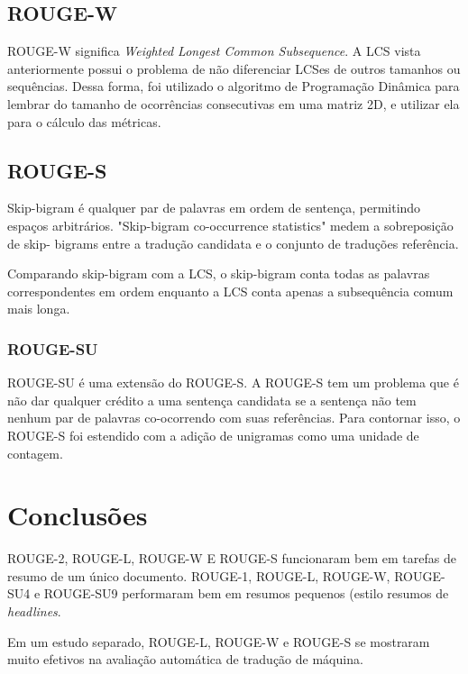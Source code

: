 \documentclass[12pt]{article}
\begin{document}
\subsection*{ROUGE-W}

ROUGE-W significa \textit{Weighted Longest Common Subsequence}. A LCS vista anteriormente possui o problema de não diferenciar LCSes de outros tamanhos ou sequências. Dessa forma, foi utilizado o algoritmo de Programação Dinâmica para lembrar do tamanho de ocorrências consecutivas em uma matriz 2D, e utilizar ela para o cálculo das métricas.

\subsection*{ROUGE-S}

Skip-bigram é qualquer par de palavras em ordem de sentença, permitindo espaços arbitrários. "Skip-bigram co-occurrence statistics" medem a sobreposição de skip-
bigrams entre a tradução candidata e o conjunto de traduções referência.

Comparando skip-bigram com a LCS, o skip-bigram conta todas as palavras correspondentes em ordem enquanto a LCS conta apenas a subsequência comum mais longa.

\subsubsection*{ROUGE-SU}

ROUGE-SU é uma extensão do ROUGE-S. A ROUGE-S tem um problema que é não dar qualquer crédito a uma sentença candidata se a sentença não tem nenhum par de palavras co-ocorrendo com suas referências. Para contornar isso, o ROUGE-S foi estendido com a adição de unigramas como uma unidade de contagem.

\section*{Conclusões}

ROUGE-2, ROUGE-L, ROUGE-W E ROUGE-S funcionaram bem em tarefas de resumo de um único documento. ROUGE-1, ROUGE-L, ROUGE-W, ROUGE-SU4 e ROUGE-SU9 performaram bem em resumos pequenos (estilo resumos de \textit{headlines}.

Em um estudo separado, ROUGE-L, ROUGE-W e ROUGE-S se mostraram muito efetivos na avaliação automática de tradução de máquina.
\end{document}
